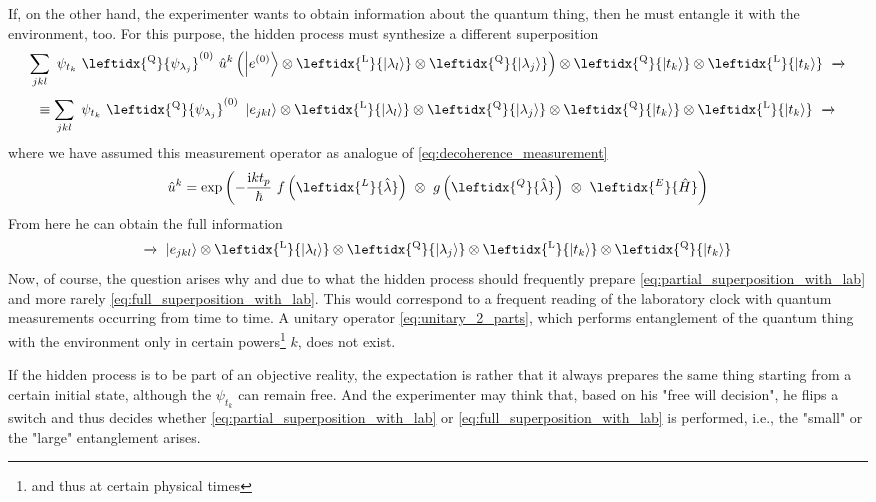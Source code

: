 \documentclass[12pt]{article}
\begin{document}
If, on the other hand, the experimenter wants to obtain information about the quantum thing, then he must entangle it with the environment, too. For this purpose, the hidden process must synthesize a different superposition
\begin{equation*}
\sum_{jkl} \ \psi_{t_k}\ \leftidx{^\mathrm{Q}}{\psi_{\lambda_j}}^{(0)}\ 
\hat{u}^k \left( \ket{e^{(0)}} \otimes \leftidx{^\mathrm{L}}{\ket{\lambda_l}} 
\otimes \leftidx{^\mathrm{Q}}{\ket{\lambda_j}} \right) 
\otimes \leftidx{^\mathrm{Q}}{\ket{t_k}}
\otimes \leftidx{^\mathrm{L}}{\ket{t_k}}
\ \xrightarrow{}
\end{equation*}
\begin{equation}
\label{eq:full_superposition_with_lab}
\equiv \sum_{jkl} \ \psi_{t_k}\ \leftidx{^\mathrm{Q}}{\psi_{\lambda_j}}^{(0)}\ 
\ket{e_{jkl}} \otimes \leftidx{^\mathrm{L}}{\ket{\lambda_l}} 
\otimes \leftidx{^\mathrm{Q}}{\ket{\lambda_j}}
\otimes \leftidx{^\mathrm{Q}}{\ket{t_k}}
\otimes \leftidx{^\mathrm{L}}{\ket{t_k}}
\ \xrightarrow{}
\end{equation}
where we have assumed this measurement operator as analogue of \eqref{eq:decoherence_measurement} 
\begin{equation*}
\hat{u}^k = \mathrm{exp}\left(
-\frac{\mathrm{i}k t_p}{\hbar}\ f\left(\leftidx{^L}{\hat{\lambda}}\right)\ \otimes\  g\left(\leftidx{^Q}{\hat{\lambda}}\right)\ \otimes\ \leftidx{^E}{\hat{H}}
\right)
\end{equation*}
From here he can obtain the full information
\begin{equation*}
\xrightarrow{}\ \ket{e_{jkl}} 
\otimes \leftidx{^\mathrm{L}}{\ket{\lambda_l}} 
\otimes \leftidx{^\mathrm{Q}}{\ket{\lambda_j}}
\otimes \leftidx{^\mathrm{L}}{\ket{t_k}}
\otimes \leftidx{^\mathrm{Q}}{\ket{t_k}}
\end{equation*}
Now, of course, the question arises why and due to what the hidden process should frequently prepare \eqref{eq:partial_superposition_with_lab} and more rarely \eqref{eq:full_superposition_with_lab}. This would correspond to a frequent reading of the laboratory clock with quantum measurements occurring from time to time. A unitary operator \eqref{eq:unitary_2_parts}, which performs entanglement of the quantum thing with the environment only in certain powers\footnote{and thus at certain physical times} $k$, does not exist.

If the hidden process is to be part of an objective reality, the expectation is rather that it always prepares the same thing starting from a certain initial state, although the $\psi_{t_k}$ can remain free. And the experimenter may think that, based on his "free will decision", he flips a switch and thus decides whether \eqref{eq:partial_superposition_with_lab} or \eqref{eq:full_superposition_with_lab} is performed, i.e., the "small" or the "large" entanglement arises.
\end{document}
